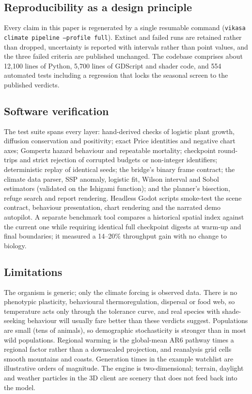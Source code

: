 \documentclass[conference]{IEEEtran}
\begin{document}
\subsection{Reproducibility as a design principle}
Every claim in this paper is regenerated by a single resumable command
(\texttt{vikasa climate pipeline --profile full}). Extinct and failed runs are
retained rather than dropped, uncertainty is reported with intervals rather than
point values, and the three failed criteria are published unchanged. The codebase
comprises about 12{,}100 lines of Python, 5{,}700 lines of GDScript and shader
code, and 554 automated tests including a regression that locks the seasonal
screen to the published verdicts.

\subsection{Software verification}
The test suite spans every layer: hand-derived checks of logistic plant growth,
diffusion conservation and positivity; exact Price identities and negative chart
axes; Gompertz hazard behaviour and repeatable mortality; checkpoint round-trips
and strict rejection of corrupted budgets or non-integer identifiers; deterministic
replay of identical seeds; the bridge's binary frame contract; the climate data
parser, SSP anomaly, logistic fit, Wilson interval and Sobol estimators (validated
on the Ishigami function); and the planner's bisection, refuge search and report
rendering. Headless Godot scripts smoke-test the scene contract, behaviour
presentation, chart rendering and the narrated demo autopilot. A separate
benchmark tool compares a historical spatial index against the current one while
requiring identical full checkpoint digests at warm-up and final boundaries; it
measured a 14--20\% throughput gain with no change to biology.

\subsection{Limitations}
The organism is generic; only the climate forcing is observed data. There is no
phenotypic plasticity, behavioural thermoregulation, dispersal or food web, so
temperature acts only through the tolerance curve, and real species with
shade-seeking behaviour will usually fare better than these verdicts suggest.
Populations are small (tens of animals), so demographic stochasticity is stronger
than in most wild populations. Regional warming is the global-mean AR6 pathway
times a regional factor rather than a downscaled projection, and reanalysis grid
cells smooth mountains and coasts. Generation times in the example watchlist are
illustrative orders of magnitude. The engine is two-dimensional; terrain, daylight
and weather particles in the 3D client are scenery that does not feed back into
the model.
\end{document}
